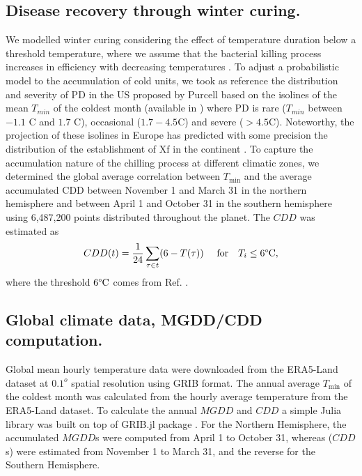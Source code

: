     \subsection{Disease recovery through winter curing.}  We modelled
    winter
    curing considering the effect of temperature duration below a threshold
    temperature, where we assume that the bacterial killing process increases
    in
    efficiency with decreasing temperatures \cite{Lieth2011}. To adjust a
    probabilistic model to the accumulation of cold units, we took as reference
    the
    distribution and severity of PD in the US proposed by Purcell based on the
    isolines of the mean $T_{ min}$ of the coldest month (available in
    \cite{Anas2008}) where PD is rare ($T_{ min}$ between $-1.1$ \textdegree C
    and
$1.7$ \textdegree C), occasional ($1.7-4.5$\textdegree C) and severe ($>
4.5$\textdegree C). Noteworthy, the projection of these isolines in Europe has
    predicted with some precision the distribution of the establishment of Xf
    in
    the continent \cite{Bragard2019}. To capture the accumulation nature of the
    chilling process at different climatic zones, we determined the global
    average
    correlation between $T_{\textrm{min}}$ and the average accumulated CDD
    between
    November 1 and March 31 in the northern hemisphere and between April 1 and
    October 31 in the southern hemisphere using 6,487,200 points distributed
    throughout the planet. The $CDD$ was estimated as
    \begin{equation}
        CDD(t)= \frac{1}{24}\sum_{\tau \in t} (6-T(\tau)) \ \quad \textrm{for}
        \quad T_i\le 6\textrm{\textdegree C} ,
    \end{equation}
    where the threshold $6 \textrm{\textdegree C}$ comes from Ref.
    \cite{Lieth2011}.

    \subsection{Global climate data, MGDD/CDD computation.}
    Global mean hourly temperature data were downloaded from the ERA5-Land
    dataset
    \cite{ERA5_dataset} at $0.1^o$ spatial resolution using GRIB format. The
    annual
    average $T_{\textrm{min}}$ of the coldest month was calculated from the
    hourly
    average temperature from the ERA5-Land dataset. To calculate the annual
$MGDD$
    and $CDD$ a simple Julia \cite{julia} library was built on top of GRIB.jl
    package \cite{GRIB}. For the Northern Hemisphere, the accumulated $MGDD$s
    were
    computed from April 1 to October 31, whereas ($CDD$s) were estimated from
    November 1 to March 31, and the reverse for the Southern Hemisphere.

